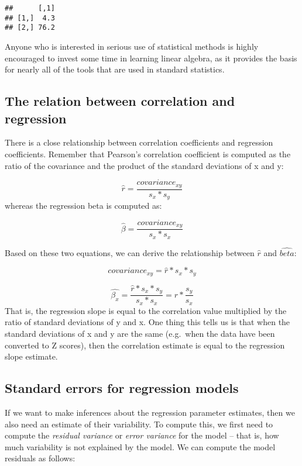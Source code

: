 \documentclass[]{book}
\theoremstyle{definition}
\theoremstyle{definition}
\theoremstyle{definition}
\theoremstyle{remark}
\begin{document}
\begin{verbatim}
##      [,1]
## [1,]  4.3
## [2,] 76.2
\end{verbatim}

Anyone who is interested in serious use of statistical methods is highly
encouraged to invest some time in learning linear algebra, as it
provides the basis for nearly all of the tools that are used in standard
statistics.

\subsection{The relation between correlation and
regression}\label{the-relation-between-correlation-and-regression}

There is a close relationship between correlation coefficients and
regression coefficients. Remember that Pearson's correlation coefficient
is computed as the ratio of the covariance and the product of the
standard deviations of x and y:

\[
\hat{r} = \frac{covariance_{xy}}{s_x * s_y}
\] whereas the regression beta is computed as:

\[
\hat{\beta} = \frac{covariance_{xy}}{s_x*s_x}
\]

Based on these two equations, we can derive the relationship between
\(\hat{r}\) and \(\hat{beta}\):

\[
covariance_{xy} = \hat{r} * s_x * s_y
\]

\[
\hat{\beta_x} =  \frac{\hat{r} * s_x * s_y}{s_x * s_x} = r * \frac{s_y}{s_x}
\] That is, the regression slope is equal to the correlation value
multiplied by the ratio of standard deviations of y and x. One thing
this tells us is that when the standard deviations of x and y are the
same (e.g.~when the data have been converted to Z scores), then the
correlation estimate is equal to the regression slope estimate.

\subsection{Standard errors for regression
models}\label{standard-errors-for-regression-models}

If we want to make inferences about the regression parameter estimates,
then we also need an estimate of their variability. To compute this, we
first need to compute the \emph{residual variance} or \emph{error
variance} for the model -- that is, how much variability is not
explained by the model. We can compute the model residuals as follows:
\end{document}
